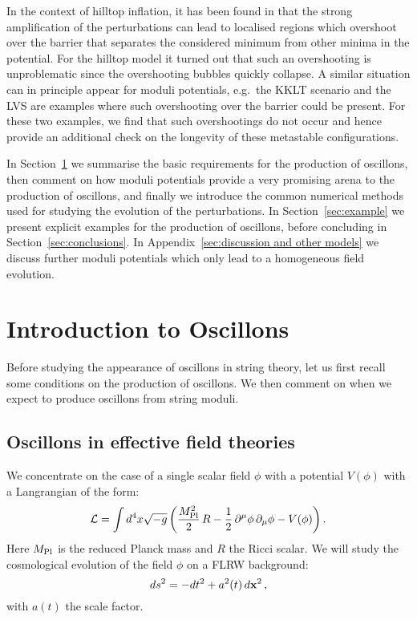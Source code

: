 \documentclass[12pt]{article}
\newcommand{\be}{\begin{equation}}
\newcommand{\ee}{\end{equation}}
\begin{document}
In the context of hilltop inflation, it has been found in \cite{Antusch:2015nla} that the strong amplification of the perturbations can lead to localised regions which overshoot over the barrier that separates the considered minimum from other minima in the potential. For the hilltop model it turned out that such an overshooting is unproblematic since the overshooting bubbles quickly collapse. A similar situation can in principle appear for moduli potentials, e.g.\ the KKLT scenario and the LVS are examples where such overshooting over the barrier could be present.  For these two examples, we find that such overshootings do not occur and hence provide an additional check on the longevity of these metastable configurations. 

In Section~\ref{sec:general} we summarise the basic requirements for the production of oscillons, then comment on how moduli potentials provide a very promising arena to the production of oscillons, and finally we introduce the common numerical methods used for studying the evolution of the perturbations. In Section~\ref{sec:example} we present explicit examples for the production of oscillons, before concluding in Section~\ref{sec:conclusions}. In Appendix~\ref{sec:discussion and other models} we discuss further moduli potentials which only lead to a homogeneous field evolution.


\section{Introduction to Oscillons}
\label{sec:general}


Before studying the appearance of oscillons in string theory, let us first recall some conditions on the production of oscillons. We then comment on when we expect to produce oscillons from string moduli.
\subsection{Oscillons in effective field theories}
\label{sec:oscillonproduction}

We concentrate on the case of a single scalar field $\phi$ with a potential $V(\phi)$ with a Langrangian of the form:
\be
\mathcal{L}= \int d^4x\sqrt{-g}\left(\frac{M_{\rm Pl}^2}{2}\, R -\frac{1}{2}\,\partial^\mu\phi\,\partial_\mu \phi - V(\phi)\right).
\ee
Here $M_{\rm Pl}$ is the reduced Planck  mass and $R$ the Ricci scalar. We will study the cosmological evolution of the field $\phi$ on a FLRW background:
\be
ds^2=-dt^2+a^2(t)\, d{\bf x}^2\,,
\ee
with $a(t)$ the scale factor.
\end{document}
